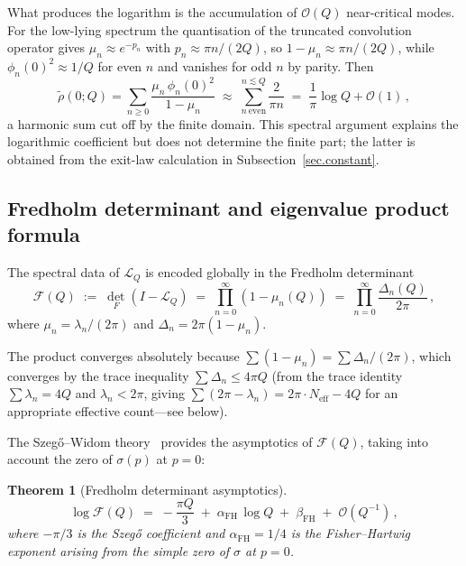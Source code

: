 \documentclass[11pt,a4paper]{article}
\newtheorem{theorem}{Theorem}[section]
\theoremstyle{definition}
\begin{document}
What produces the logarithm is the accumulation of $\mathcal O(Q)$ near-critical
modes.  For the low-lying spectrum the quantisation of the truncated
convolution operator gives $\mu_n \approx e^{-p_n}$ with $p_n \approx \pi n/(2Q)$,
so $1-\mu_n \approx \pi n /(2Q)$, while $\phi_n(0)^2 \approx 1/Q$ for even $n$ and
vanishes for odd $n$ by parity.  Then
\begin{equation}\label{eq.harmonic-mechanism}
  \tilde\rho(0;Q)
  = \sum_{n\geq0} \frac{\mu_n\,\phi_n(0)^2}{1-\mu_n}
  \;\approx\;
  \sum_{n\ \mathrm{even}}^{n \lesssim Q} \frac{2}{\pi n}
  \;=\;
  \frac{1}{\pi}\log Q + \mathcal O(1)\,,
\end{equation}
a harmonic sum cut off by the finite domain.  This spectral argument explains
the logarithmic coefficient but does not determine the finite part; the latter
is obtained from the exit-law calculation in Subsection~\ref{sec.constant}.

\subsection{Fredholm determinant and eigenvalue product formula}
\label{sec.fredholm-app}

The spectral data of $\mathcal{L}_Q$ is encoded globally in the Fredholm
determinant
\begin{equation}\label{eq.fredholm-def}
  \mathcal{F}(Q)
  \;:=\;
  \det_F(I - \mathcal{L}_Q)
  \;=\;
  \prod_{n=0}^{\infty} (1 - \mu_n(Q))
  \;=\;
  \prod_{n=0}^{\infty}
  \frac{\Delta_n(Q)}{2\pi}\,,
\end{equation}
where $\mu_n = \lambda_n/(2\pi)$ and $\Delta_n = 2\pi(1-\mu_n)$.

The product converges absolutely because
$\sum (1-\mu_n) = \sum \Delta_n/(2\pi)$, which converges by the trace
inequality $\sum \Delta_n \leq 4\pi Q$ (from the trace identity
$\sum \lambda_n = 4Q$ and $\lambda_n < 2\pi$, giving
$\sum(2\pi - \lambda_n) = 2\pi \cdot N_{\mathrm{eff}} - 4Q$ for an
appropriate effective count---see below).

The Szeg\H{o}--Widom theory~\cite{bottcher2006analysis} provides the asymptotics
of $\mathcal{F}(Q)$, taking into account the zero of
$\sigma(p)$ at $p = 0$:

\begin{theorem}[Fredholm determinant asymptotics]\label{thm:fredholm}
  \begin{equation}\label{eq.fredholm-asymp}
    \log \mathcal{F}(Q)
    \;=\;
    -\frac{\pi Q}{3}
    \;+\;
    \alpha_{\mathrm{FH}}\, \log Q
    \;+\;
    \beta_{\mathrm{FH}}
    \;+\;
    \mathcal O \left(Q^{-1}\right)\,,
  \end{equation}
  where $-\pi/3$ is the Szeg\H{o} coefficient and $\alpha_{\mathrm{FH}} = 1/4$ is the Fisher--Hartwig exponent
  arising from the simple zero of $\sigma$ at $p = 0$.
\end{theorem}
\end{document}
